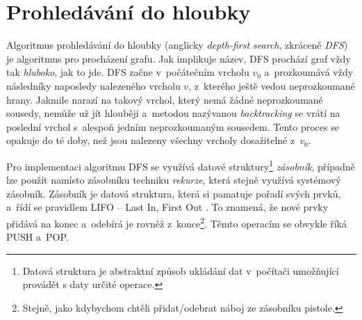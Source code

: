 \documentclass[12pt]{report}			%
\begin{document}
			\section{Prohledávání do hloubky}
			Algoritmus prohledávání do hloubky (anglicky \emph{depth-first search}, zkráceně \emph{DFS}) je algoritmus pro procházení grafu. Jak implikuje název, DFS prochází graf vždy tak \emph{hluboko}, jak to jde. DFS začne v~počátečním vrcholu $v_0$ a~prozkoumává vždy následníky naposledy nalezeného vrcholu $v$, z~kterého ještě vedou neprozkoumané hrany. Jakmile narazí na takový vrchol, který nemá žádné neprozkoumané sousedy, nemůže už jít hlouběji a~metodou nazývanou \emph{backtracking} se vrátí na poslední vrchol s~alespoň jedním neprozkoumaným sousedem. Tento proces se opakuje do té doby, než jsou nalezeny všechny vrcholy dosažitelné z~$v_0$.

Pro implementaci algoritmu DFS se využívá datové struktury\footnote{Datová struktura je abstraktní způsob ukládání dat v~počítači umožňující provádět s daty určité operace.} \emph{zásobník}, případně lze použít namísto zásobníku techniku \emph{rekurze}, která stejně využívá systémový zásobník. Zásobník je datová struktura, která si pamatuje pořadí svých prvků, a~řídí se pravidlem LIFO -- Last In, First Out%
. To znamená, že nové prvky přidává na konec a~odebírá je rovněž z~konce\footnote{Stejně, jako kdybychom chtěli přidat/odebrat náboj ze zásobníku pistole.}. Těmto operacím se obvykle říká PUSH a~POP.
\end{document}
